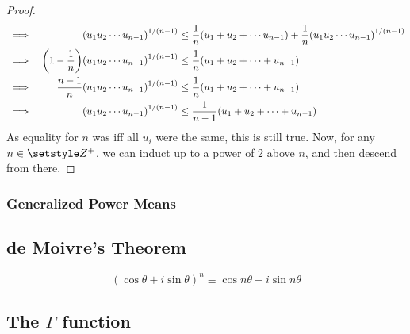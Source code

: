 \begin{proof}
\begin{alignat*}
&\implies& \pqty{u_1 u_2 \dotsm u_{n - 1}}^{1 / (n - 1)} &\le
         \frac 1n \pqty{u_1 + u_2 + \dotsb u_{n - 1}} +
         \frac 1n \pqty{u_1 u_2 \dotsm u_{n - 1}}^{1 / (n - 1)} \\
&\implies& \pqty{1 - \frac 1n}
         \pqty{u_1 u_2 \dotsm u_{n - 1}}^{1 / (n - 1)} &\le
         \frac 1n \pqty{u_1 + u_2 + \dotsb + u_{n - 1}} \\
&\implies& \frac {n - 1}n
         \pqty{u_1 u_2 \dotsb u_{n - 1}}^{1 / (n - 1)} &\le
         \frac 1n \pqty{u_1 + u_2 + \dotsb + u_{n - 1}} \\
&\implies& \pqty{u_1 u_2 \dotsm u_{n - 1}}^{1 / (n - 1)} &\le
         \frac 1{n - 1} \pqty{u_1 + u_2 + \dotsb + u_{n - 1}}
\end{alignat*}
As equality for \(n\) was iff all \(u_i\) were the same, this is still true.
Now, for any \(n \in \Integers^+\), we can induct up to a power of 2 above
\(n\), and then descend from there.
\end{proof}

\subsubsection{Generalized Power Means}

\subsection{de Moivre's Theorem}

\begin{equation}
(\cos \theta + i \sin \theta)^n \equiv \cos n\theta + i \sin n\theta
\end{equation}

\subsection[The \texorpdfstring{\(\Gamma\)}{Gamma} function]
           {The \boldmath\(\Gamma\) function}

